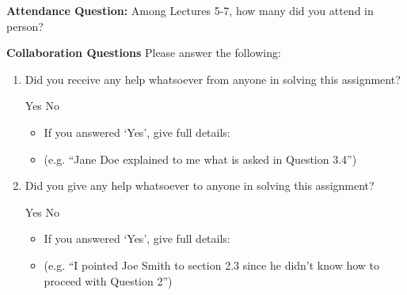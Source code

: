 \documentclass[11pt,addpoints,answers]{exam}
\numberwithin{equation}{section} %
\numberwithin{figure}{section} %
\numberwithin{table}{section} %
\begin{document}
\clearpage
\textbf{Attendance Question:} Among Lectures 5-7, how many did you attend in person?

\begin{tcolorbox}[fit,height=1cm,blank, borderline={1pt}{-2pt},nobeforeafter]
\end{tcolorbox}

    
\textbf{Collaboration Questions} Please answer the following:

\begin{enumerate}
    \item Did you receive any help whatsoever from anyone in solving this assignment?
    \begin{checkboxes}
     \choice Yes
     \choice No
    \end{checkboxes}
    \begin{itemize}
        \item If you answered `Yes', give full details:
        \item (e.g. “Jane Doe explained to me what is asked in Question 3.4”)
    \end{itemize}

    \begin{tcolorbox}[fit,height=3cm,blank, borderline={1pt}{-2pt},nobeforeafter]
    \end{tcolorbox}

    \item Did you give any help whatsoever to anyone in solving this assignment?
    \begin{checkboxes}
     \choice Yes
     \choice No
    \end{checkboxes}
    \begin{itemize}
        \item If you answered `Yes', give full details:
        \item (e.g. “I pointed Joe Smith to section 2.3 since he didn’t know how to proceed with Question 2”)
    \end{itemize}

    \begin{tcolorbox}[fit,height=3cm,blank, borderline={1pt}{-2pt},nobeforeafter]
    \end{tcolorbox}


\end{enumerate}
\end{document}
